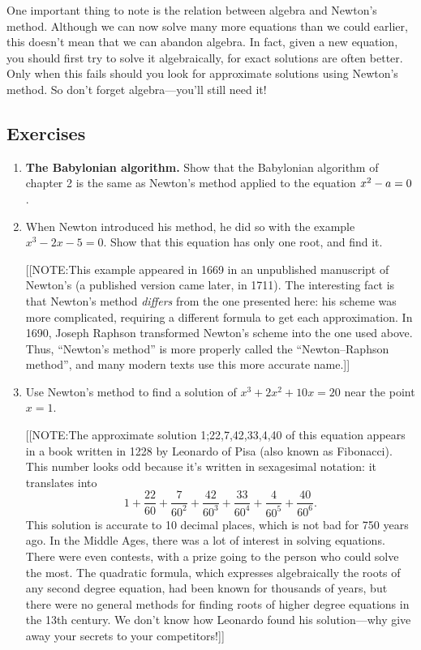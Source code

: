 One important thing to note is the relation between algebra and
Newton's method.  Although we can now solve many more equations than
we could earlier, this doesn't mean that we can abandon algebra.  In
fact, given a new equation, you should first try to solve it
algebraically, for exact solutions are often better.  Only when this
fails should you look for approximate solutions using Newton's method.
So don't forget algebra---you'll still need it!


\subsection{Exercises}
\label{subsec:exercises}


\begin{enumerate}
\item {\bf The Babylonian algorithm.} Show
that the Babylonian algorithm of chapter 2 is the same as Newton's
method applied to the equation $x^2-a=0\/$.


\item When Newton introduced his method, he did so with the example
$x^3 - 2x - 5 = 0$.  Show that this equation has only one root, and
find it.

[[NOTE:This example appeared in 1669 in an unpublished manuscript of
  Newton's (a published version came later, in 1711).  The interesting
  fact is that Newton's method {\em differs\/} from the one presented
  here: his scheme was more complicated, requiring a different formula
  to get each approximation.  In 1690, Joseph Raphson transformed Newton's scheme into the one used above.
  Thus, ``Newton's method'' is more properly called the
  ``Newton--Raphson method'', and many modern texts use this more
  accurate name.]]


\item Use Newton's method to find a solution of $x^3 + 2x^2 + 10x = 20$
near the point $x=1$.

[[NOTE:The approximate solution 1;22,7,42,33,4,40 of this equation
  appears in a book written in 1228 by Leonardo of Pisa (also known as \mbox{Fibonacci}).  This
  number looks odd because it's written in sexagesimal notation: it
  translates into
\[
1+\frac{22}{60} +\frac{7}{60^2}+\frac{42}{60^3}+\frac{33}{60^4}+\frac{4}{60^5}+\frac{40}{60^6}.
\]
This solution is accurate to 10 decimal places, which is not bad for
750 years ago.  In the Middle Ages, there was a lot of interest in
solving equations. There were even contests, with a prize going to the
person who could solve the most. The quadratic formula, which
expresses algebraically the roots of any second degree equation, had
been known for thousands of years, but there were no general methods
for finding roots of higher degree equations in the 13th century.  We
don't know how Leonardo found his solution---why give away your
secrets to your competitors!]]



\end{enumerate}
